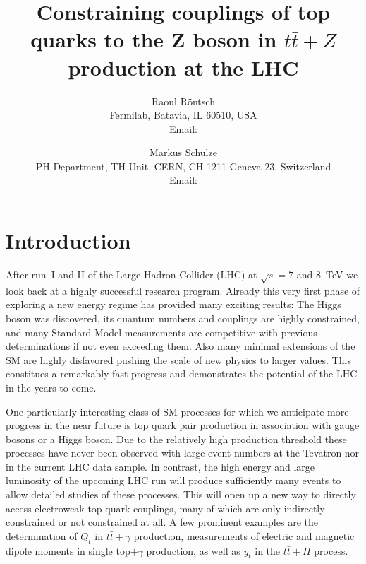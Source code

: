 \documentclass[preprint]{JHEP3} %
\title{Constraining couplings of top quarks to the Z boson in $t\bar{t}+Z$ production at the LHC}
\author{Raoul R\"ontsch \\ Fermilab, Batavia, IL 60510, USA \\
  Email: \email{rontsch@fnal.gov} }
\author{Markus Schulze \\ PH Department, TH Unit, CERN, CH-1211 Geneva 23, Switzerland \\
  Email: \email{markus.schulze@cern.ch} }
\def\ttb{t\bar{t}}
\begin{document}
\section{Introduction}
After run~I and II of the Large Hadron Collider (LHC) at $\sqrt{s}=7$ and 8~TeV we look back at a highly successful research program.
Already this very first phase of exploring a new energy regime has provided many exciting results:
The Higgs boson was discovered, its quantum numbers and couplings are highly constrained,
and many Standard Model measurements are competitive with previous determinations if not even exceeding them.
Also many minimal extensions of the SM are highly disfavored pushing the scale of new physics to larger values.
This constitues a remarkably fast progress and demonstrates the potential of the LHC in the years to come.

One particularly interesting class of SM processes for which we anticipate more progress in the near future is top quark pair production in association with gauge bosons or a Higgs boson.
Due to the relatively high production threshold these processes have never been observed with large event numbers at the Tevatron
nor in the current LHC data sample.
In contrast, the high energy and large luminosity of the upcoming LHC run will produce sufficiently many events to allow detailed studies of these processes.
This will open up a new way to directly access electroweak top quark couplings, many of which are only indirectly constrained or not constrained at all.
A few prominent examples are the determination of $Q_t$ in $\ttb+\gamma$ production, measurements of electric and magnetic dipole moments in single top$+\gamma$ production, 
as well as $y_t$ in the $\ttb+H$ process.

\end{document}
